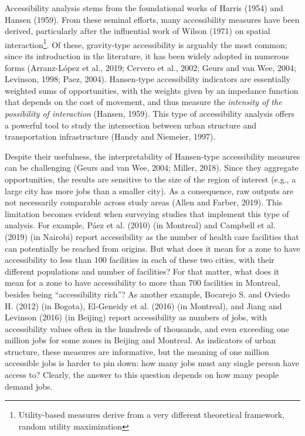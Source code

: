 \documentclass[]{elsarticle} %
\begin{document}
Accessibility analysis stems from the foundational works of Harris
(1954) and Hansen (1959). From these seminal efforts, many accessibility
measures have been derived, particularly after the influential work of
Wilson (1971) on spatial interaction\footnote{Utility-based measures
  derive from a very different theoretical framework, random utility
  maximization}. Of these, gravity-type accessibility is arguably the
most common; since its introduction in the literature, it has been
widely adopted in numerous forms (Arranz-López et al., 2019; Cervero et
al., 2002; Geurs and van Wee, 2004; Levinson, 1998; Paez, 2004).
Hansen-type accessibility indicators are essentially weighted sums of
opportunities, with the weights given by an impedance function that
depends on the cost of movement, and thus measure the \emph{intensity of
the possibility of interaction} (Hansen, 1959). This type of
accessibility analysis offers a powerful tool to study the intersection
between urban structure and transportation infrastructure (Handy and
Niemeier, 1997).

Despite their usefulness, the interpretability of Hansen-type
accessibility measures can be challenging (Geurs and van Wee, 2004;
Miller, 2018). Since they aggregate opportunities, the results are
sensitive to the size of the region of interest (e.g., a large city has
more jobs than a smaller city). As a consequence, raw outputs are not
necessarily comparable across study areas (Allen and Farber, 2019). This
limitation becomes evident when surveying studies that implement this
type of analysis. For example, Páez et al. (2010) (in Montreal) and
Campbell et al. (2019) (in Nairobi) report accessibility as the number
of health care facilities that can potentially be reached from origins.
But what does it mean for a zone to have accessibility to less than 100
facilities in each of these two cities, with their different populations
and number of facilities? For that matter, what does it mean for a zone
to have accessibility to more than 700 facilities in Montreal, besides
being ``accessibility rich''? As another example, Bocarejo S. and Oviedo
H. (2012) (in Bogota), El-Geneidy et al. (2016) (in Montreal), and Jiang
and Levinson (2016) (in Beijing) report accessibility as numbers of
jobs, with accessibility values often in the hundreds of thousands, and
even exceeding one million jobs for some zones in Beijing and Montreal.
As indicators of urban structure, these measures are informative, but
the meaning of one million accessible jobs is harder to pin down: how
many jobs must any single person have access to? Clearly, the answer to
this question depends on how many people demand jobs.
\end{document}
